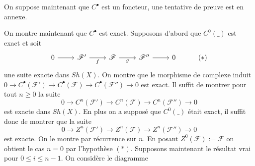 \documentclass[a4paper,12pt]{article}
\newcommand{\F}{\mathscr F}
\theoremstyle{plain}
\theoremstyle{definition}
\theoremstyle{remark}
\begin{document}
On suppose maintenant que $C^\bullet$ est un foncteur, une tentative de
preuve est en annexe.
\newline

On montre maintenant que $C^\bullet$ est exact. Supposons d'abord que $C^0(\_)$ est exact et soit 
\[\begin{tikzcd}
	0 & {\F'} & \F & {\F''} & 0 & {(*)}
	\arrow[from=1-1, to=1-2]
	\arrow["f"', from=1-2, to=1-3]
	\arrow["g"', from=1-3, to=1-4]
	\arrow[from=1-4, to=1-5]
\end{tikzcd}\]
une suite exacte dans $Sh(X)$. On montre que le morphisme de complexe
induit $0\to C^\bullet(\F')\to C^\bullet(\F)\to C^\bullet(\F'')\to 0$
est exact. Il suffit de montrer pour tout $n\geq 0$ la suite
\[0\to C^n(\F')\to C^n(\F)\to C^n(\F'')\to 0\]
est exacte dans $Sh(X)$. En plus on a supposé que $C^0(\_)$ était exact,
il suffit donc de montrer que la suite
\[0\to Z^n(\F')\to Z^n(\F)\to Z^n(\F'')\to 0\]
est exacte. On le montre par récurrence sur $n$. En posant $Z^0(\F):=\F$
on obtient le cas $n=0$ par l'hypothèse $(*)$. Supposons 
maintenant le résultat vrai pour $0\leq i\leq n-1$.
On considère le diagramme 
\end{document}

